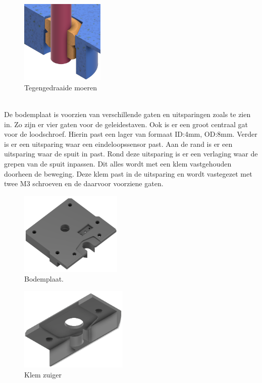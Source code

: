 \begin{minipage}[t]{0.49\textwidth}
    \begin{figure}[H]
        \centering
        \includegraphics[height=4cm]{figures/InterlockingScrews.png}
        \caption{Tegengedraaide moeren}\label{fig:counterrotated}
    \end{figure}
\end{minipage}\\[12pt]
De bodemplaat is voorzien van verschillende gaten en uitsparingen zoals te zien in. Zo zijn er vier gaten voor de geleidestaven. Ook is er een groot centraal gat voor de loodschroef. Hierin past een lager van formaat ID:4mm, OD:8mm. Verder is er een uitsparing waar een eindeloopssensor past. Aan de rand is er een uitsparing waar de spuit in past. Rond deze uitsparing is er een verlaging waar de grepen van de spuit inpassen. Dit alles wordt met een klem vastgehouden doorheen de beweging. Deze klem past in de uitsparing en wordt vastegezet met twee M3 schroeven en de daarvoor voorziene gaten.
\\[12pt]\begin{minipage}[t]{0.49\textwidth}
    \vspace{0pt}
    \begin{figure}[H]
        \centering
        \includegraphics[height=4cm]{figures/Foundation_1_w.png}
        \caption{Bodemplaat.}\label{fig:bodemplaat}
    \end{figure}
\end{minipage}
\begin{minipage}[t]{0.49\textwidth}
    \vspace{0pt}
    \begin{figure}[H]
        \centering
        \includegraphics[height=4cm]{figures/Foundation_clamp_w.png}
        \caption{Klem zuiger}\label{fig:clamp}
    \end{figure}
\end{minipage}\\

